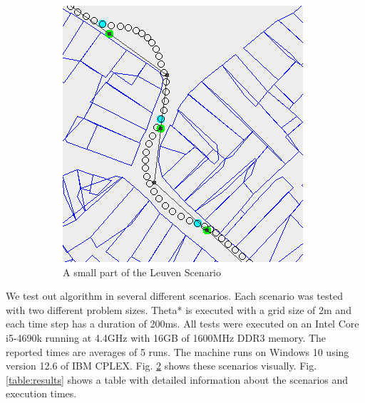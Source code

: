 \begin{figure}
\begin{subfigure}[t]{0.40\columnwidth}
        		\includegraphics[width=\textwidth]{img/leuven_zoom}
        		\caption{A small part of the Leuven Scenario}
        		\label{fig:scen-leuven}
	\end{subfigure}
        
    \caption{}\label{fig:scenarios}
\end{figure}
We test out algorithm in several different scenarios. Each scenario was tested with two different problem sizes. Theta* is executed with a grid size of 2m and each time step has a duration of 200ms. All tests were executed on an Intel Core i5-4690k running at 4.4GHz with 16GB of 1600MHz DDR3 memory. The reported times are averages of 5 runs. The machine runs on Windows 10 using version 12.6 of IBM CPLEX. Fig. \ref{fig:scenarios} shows these scenarios visually. Fig. \ref{table:results} shows a table with detailed information about the scenarios and execution times.

